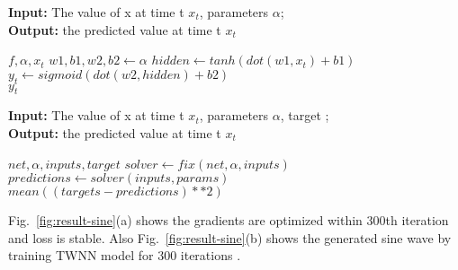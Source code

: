 \documentclass{article}
\begin{document}
\begin{algorithm}
	\caption{Neural Network as the objective function for the proposed model}

	\hspace*{\algorithmicindent} \textbf{Input:} The value of x at time t $x_t$, parameters $\alpha$;    \\
	\hspace*{\algorithmicindent} \textbf{Output:} the predicted value at time t  $x_t$
\begin{algorithmic}[1]
	 {$f, \alpha, x_{t}$}
	\State  $ w1, b1, w2, b2 \leftarrow \alpha$
	\State  $	hidden \leftarrow tanh(dot(w1, x_{t}) +b1 )$
	\State  $y_{t }\leftarrow  sigmoid(dot(w2, hidden)+b2)$\\
   	\Return  $y_{t}$
   	\EndProcedure
\end{algorithmic}
\label{alg:fixet}
\end{algorithm}


\begin{algorithm}
	\caption{Loss function for the proposed model}

	\hspace*{\algorithmicindent} \textbf{Input:} The value of x at time t $x_t$, parameters $\alpha$, target ;    \\
	\hspace*{\algorithmicindent} \textbf{Output:} the predicted value at time t  $x_t$
\begin{algorithmic}[1]
	 {$net, \alpha, inputs, target$}
	\State  $ solver \leftarrow fix(net, \alpha, inputs)$
	\State  $	predictions \leftarrow solver(inputs, params)$    \\
   	\Return  $mean((targets - predictions)**2)$
   	\EndProcedure
\end{algorithmic}
\label{alg:net}
\end{algorithm}

Fig.~\ref{fig:result-sine}(a) shows the gradients are optimized within 300th iteration and loss is stable. Also Fig.~\ref{fig:result-sine}(b) shows the generated sine wave by training TWNN model for 300 iterations .


\begin{figure*}[htb]
	\hfill
	\hfill
	\caption{Result of continuous Sine wave generation by TWNN}
	\label{fig:result-sine}
\end{figure*}
\end{document}

